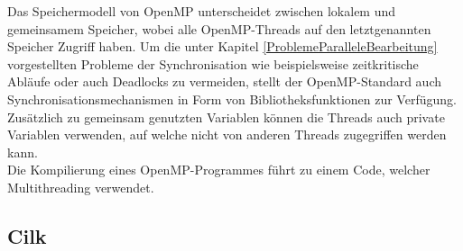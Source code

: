 			Das Speichermodell von OpenMP unterscheidet zwischen lokalem und gemeinsamem Speicher, wobei alle OpenMP-Threads auf den letztgenannten Speicher Zugriff haben. Um die unter Kapitel \ref{ProblemeParalleleBearbeitung} vorgestellten Probleme der Synchronisation wie beispielsweise zeitkritische Abläufe oder auch Deadlocks zu vermeiden, stellt der OpenMP-Standard auch Synchronisationsmechanismen in Form von Bibliotheksfunktionen zur Verfügung. Zusätzlich zu gemeinsam genutzten Variablen können die Threads auch private Variablen verwenden, auf welche nicht von anderen Threads zugegriffen werden kann.\\
			Die Kompilierung eines OpenMP-Programmes führt zu einem Code, welcher Multithreading verwendet. \cite{ParaProgRauber} \cite{OpenMPWikipedia}

		\subsection{Cilk}
			\label{Cilk}
			
